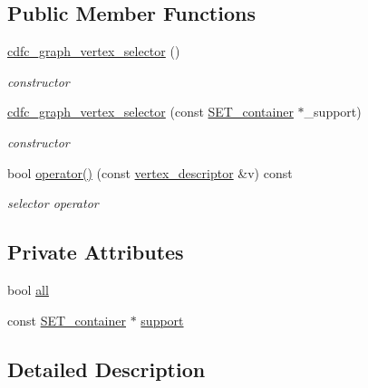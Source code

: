 \subsection*{Public Member Functions}
\begin{DoxyCompactItemize}
\item 
\hyperlink{structcdfc__graph__vertex__selector_aa46e72246164e7a4d3afd5d3f086da59}{cdfc\+\_\+graph\+\_\+vertex\+\_\+selector} ()
\begin{DoxyCompactList}\small\item\em constructor \end{DoxyCompactList}\item 
\hyperlink{structcdfc__graph__vertex__selector_a03c0a5d73a3c817560b9bb13632a87fd}{cdfc\+\_\+graph\+\_\+vertex\+\_\+selector} (const \hyperlink{structcdfc__graph__vertex__selector_a4eabaf16609aadaa7ed6bcb236d82950}{S\+E\+T\+\_\+container} $\ast$\+\_\+support)
\begin{DoxyCompactList}\small\item\em constructor \end{DoxyCompactList}\item 
bool \hyperlink{structcdfc__graph__vertex__selector_aeef42f80e4940392424ec72adf57c1c8}{operator()} (const \hyperlink{structcdfc__graph__vertex__selector_a4cafbcfc2a2a46718e5a8330b56398fb}{vertex\+\_\+descriptor} \&v) const
\begin{DoxyCompactList}\small\item\em selector operator \end{DoxyCompactList}\end{DoxyCompactItemize}
\subsection*{Private Attributes}
\begin{DoxyCompactItemize}
\item 
bool \hyperlink{structcdfc__graph__vertex__selector_a2769895af504c2dbe53186749ba1d8c6}{all}
\item 
const \hyperlink{structcdfc__graph__vertex__selector_a4eabaf16609aadaa7ed6bcb236d82950}{S\+E\+T\+\_\+container} $\ast$ \hyperlink{structcdfc__graph__vertex__selector_ae62454b1394b8795f9dd86f30b06ebda}{support}
\end{DoxyCompactItemize}


\subsection{Detailed Description}
